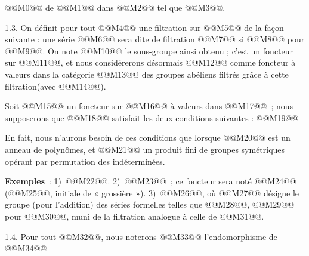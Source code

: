 
@@M0@@ de @@M1@@ dans @@M2@@ tel que @@M3@@.

1.3. On définit pour tout @@M4@@ une filtration sur @@M5@@ de la façon suivante : une série @@M6@@ sera dite de filtration @@M7@@ si @@M8@@ pour @@M9@@. On note @@M10@@ le sous-groupe ainsi obtenu ; c'est un foncteur sur @@M11@@, et nous considérerons désormais @@M12@@ comme foncteur à valeurs dans la catégorie @@M13@@ des groupes abéliens filtrés grâce à cette filtration(avec @@M14@@).

Soit @@M15@@ un foncteur sur @@M16@@ à valeurs dans @@M17@@~; nous supposerons que @@M18@@ satisfait les deux conditions suivantes :
@@M19@@

En fait, nous n'aurons besoin de ces conditions que lorsque @@M20@@ est un anneau de polynômes, et @@M21@@ un produit fini de groupes symétriques opérant par permutation des indéterminées.

\textbf{Exemples}~: 1)~@@M22@@. 2)~@@M23@@~; ce foncteur sera noté @@M24@@ (@@M25@@, initiale de « grossière »). 3)~@@M26@@, où @@M27@@ désigne le groupe (pour l'addition) des séries formelles telles que @@M28@@, @@M29@@ pour @@M30@@, muni de la filtration analogue à celle de @@M31@@.

1.4. Pour tout @@M32@@, nous noterons @@M33@@ l'endomorphisme de @@M34@@
